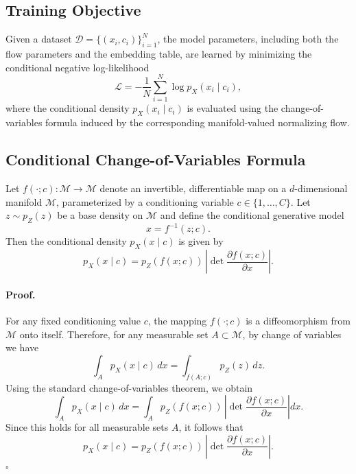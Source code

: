 \documentclass{article}
\begin{document}
\subsection{Training Objective}
\label{sec:objective}

Given a dataset $\mathcal{D} = \{(x_i, c_i)\}_{i=1}^N$, the model parameters, including both the flow parameters and the embedding table, are learned by minimizing the conditional negative log-likelihood
\begin{equation}
\mathcal{L} = -\frac{1}{N} \sum_{i=1}^N \log p_X(x_i \mid c_i),
\end{equation}
where the conditional density $p_X(x_i \mid c_i)$ is evaluated using the change-of-variables formula induced by the corresponding manifold-valued normalizing flow.


\subsection{Conditional Change-of-Variables Formula}

Let $f(\cdot; c): \mathcal{M} \to \mathcal{M}$ denote an invertible, differentiable map on a $d$-dimensional manifold $\mathcal{M}$, parameterized by a conditioning variable $c \in \{1,\dots,C\}$. Let $z \sim p_Z(z)$ be a base density on $\mathcal{M}$ and define the conditional generative model
\begin{equation}
x = f^{-1}(z; c).
\end{equation}
Then the conditional density $p_X(x \mid c)$ is given by
\begin{equation}
p_X(x \mid c) = p_Z(f(x; c)) \, \left| \det \frac{\partial f(x; c)}{\partial x} \right|.
\end{equation}

\paragraph{Proof.}
For any fixed conditioning value $c$, the mapping $f(\cdot; c)$ is a diffeomorphism from $\mathcal{M}$ onto itself. Therefore, for any measurable set $A \subset \mathcal{M}$, by change of variables we have
\begin{equation}
\int_A p_X(x \mid c)\, dx
=
\int_{f(A; c)} p_Z(z)\, dz.
\end{equation}
Using the standard change-of-variables theorem, we obtain
\begin{equation}
\int_A p_X(x \mid c)\, dx
=
\int_A p_Z(f(x; c)) \, \left| \det \frac{\partial f(x; c)}{\partial x} \right| dx.
\end{equation}
Since this holds for all measurable sets $A$, it follows that
\begin{equation}
p_X(x \mid c) = p_Z(f(x; c)) \, \left| \det \frac{\partial f(x; c)}{\partial x} \right|.
\end{equation}
\hfill$\square$
\end{document}
